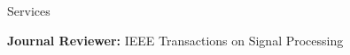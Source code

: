 
\begin{rSection}{Services}
    
     \small{{\bf Journal Reviewer:} IEEE Transactions on Signal Processing
  


}
    \end{rSection}